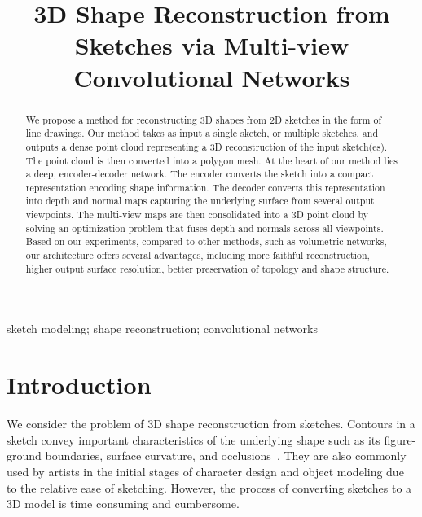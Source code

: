 \documentclass[10pt, conference, compsocconf]{IEEEtran}
\begin{document}
\title{3D Shape Reconstruction from Sketches via Multi-view Convolutional Networks \vspace{-3mm}}
\author{
}

\maketitle


\begin{abstract}
We propose a method for reconstructing 3D shapes from 2D sketches in the form of line drawings. Our method takes as input a single sketch, or multiple sketches, and outputs a dense point cloud representing a 3D reconstruction of the input sketch(es). The point cloud is then converted into a polygon mesh. At the heart of our method lies a deep, encoder-decoder network. The encoder converts the sketch into a compact representation encoding shape information. The decoder converts this representation into depth and normal maps capturing the underlying surface from several output viewpoints. The multi-view maps are then consolidated into a 3D point cloud by solving an optimization problem that fuses depth and normals across all viewpoints.  Based on our experiments, compared to other methods, such as volumetric networks, our architecture offers several advantages, including more faithful reconstruction, higher output surface resolution, better preservation of  topology and shape structure.
\vspace{-2mm}
\end{abstract}

\begin{IEEEkeywords}
sketch modeling; shape reconstruction; convolutional networks
\end{IEEEkeywords}


\vspace{-3mm}
\section{Introduction}
\label{sec:introduction}
\vspace{-2mm}
We consider the problem of 3D shape reconstruction from sketches. Contours in a sketch convey important characteristics of the underlying shape such as its figure-ground boundaries, surface curvature, and occlusions~\cite{koenderink1984does,waltz1975understanding,malik1987interpreting}. They are also commonly used by artists in the initial stages of character design and object modeling due to the relative ease of sketching. However, the process of converting sketches to a 3D model is time consuming and cumbersome. 
\end{document}
